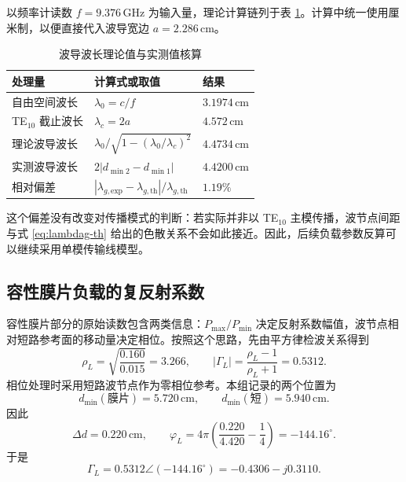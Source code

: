 \documentclass[UTF8]{ctexart}
\begin{document}
以频率计读数 $f=9.376\,\mathrm{GHz}$ 为输入量，理论计算链列于表 \ref{tab:lambda-chain}。计算中统一使用厘米制，以便直接代入波导宽边 $a=2.286\,\mathrm{cm}$。

\begin{table}[H]
  \centering
  \caption{波导波长理论值与实测值核算}
  \label{tab:lambda-chain}
  \begin{tabular}{lll}
    \toprule
    处理量 & 计算式或取值 & 结果 \\
    \midrule
    自由空间波长 & $\lambda_0=c/f$ & $3.1974\,\mathrm{cm}$ \\
    TE$_{10}$ 截止波长 & $\lambda_c=2a$ & $4.572\,\mathrm{cm}$ \\
    理论波导波长 & $\lambda_0/\sqrt{1-(\lambda_0/\lambda_c)^2}$ & $4.4734\,\mathrm{cm}$ \\
    实测波导波长 & $2|d_{\min2}-d_{\min1}|$ & $4.4200\,\mathrm{cm}$ \\
    相对偏差 & $|\lambda_{g,\mathrm{exp}}-\lambda_{g,\mathrm{th}}|/\lambda_{g,\mathrm{th}}$ & $1.19\%$ \\
    \bottomrule
  \end{tabular}
\end{table}

这个偏差没有改变对传播模式的判断：若实际并非以 TE$_{10}$ 主模传播，波节点间距与式 \eqref{eq:lambdag-th} 给出的色散关系不会如此接近。因此，后续负载参数反算可以继续采用单模传输线模型。

\subsection{容性膜片负载的复反射系数}

容性膜片部分的原始读数包含两类信息：$P_{\max}/P_{\min}$ 决定反射系数幅值，波节点相对短路参考面的移动量决定相位。按照这个思路，先由平方律检波关系得到
\begin{equation}
  \rho_L=\sqrt{\frac{0.160}{0.015}}=3.266,\qquad
  |\Gamma_L|=\frac{\rho_L-1}{\rho_L+1}=0.5312.
\end{equation}
相位处理时采用短路波节点作为零相位参考。本组记录的两个位置为
\[
  d_{\min}(\text{膜片})=5.720\,\mathrm{cm},\qquad
  d_{\min}(\text{短})=5.940\,\mathrm{cm}.
\]
因此
\begin{equation}
  \Delta d=0.220\,\mathrm{cm},\qquad
  \varphi_L=4\pi\left(\frac{0.220}{4.420}-\frac{1}{4}\right)=-144.16^\circ.
\end{equation}
于是
\begin{equation}
  \Gamma_L=0.5312\angle(-144.16^\circ)
  =-0.4306-j0.3110.
\end{equation}
\end{document}
